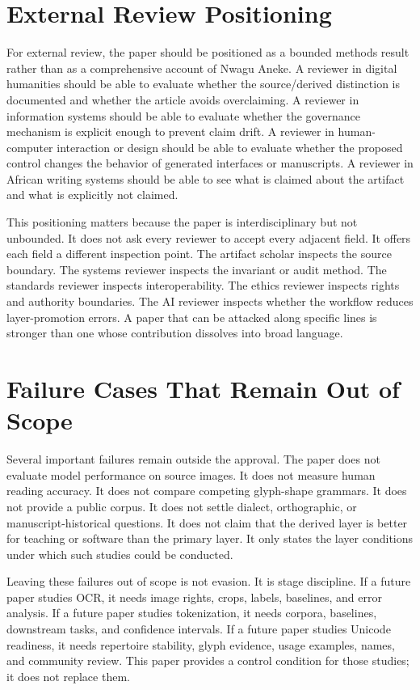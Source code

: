 \documentclass[sigconf,nonacm]{acmart}
\begin{document}
\section{External Review Positioning}
For external review, the paper should be positioned as a bounded methods result
rather than as a comprehensive account of Nwagu Aneke. A reviewer in digital
humanities should be able to evaluate whether the source/derived distinction is
documented and whether the article avoids overclaiming. A reviewer in
information systems should be able to evaluate whether the governance mechanism
is explicit enough to prevent claim drift. A reviewer in human-computer
interaction or design should be able to evaluate whether the proposed control
changes the behavior of generated interfaces or manuscripts. A reviewer in
African writing systems should be able to see what is claimed about the artifact
and what is explicitly not claimed.

This positioning matters because the paper is interdisciplinary but not
unbounded. It does not ask every reviewer to accept every adjacent field. It
offers each field a different inspection point. The artifact scholar inspects
the source boundary. The systems reviewer inspects the invariant or audit
method. The standards reviewer inspects interoperability. The ethics reviewer
inspects rights and authority boundaries. The AI reviewer inspects whether the
workflow reduces layer-promotion errors. A paper that can be attacked along
specific lines is stronger than one whose contribution dissolves into broad
language.

\section{Failure Cases That Remain Out of Scope}
Several important failures remain outside the approval. The paper does not
evaluate model performance on source images. It does not measure human reading
accuracy. It does not compare competing glyph-shape grammars. It does not
provide a public corpus. It does not settle dialect, orthographic, or
manuscript-historical questions. It does not claim that the derived layer is
better for teaching or software than the primary layer. It only states the layer
conditions under which such studies could be conducted.

Leaving these failures out of scope is not evasion. It is stage discipline. If a
future paper studies OCR, it needs image rights, crops, labels, baselines, and
error analysis. If a future paper studies tokenization, it needs corpora,
baselines, downstream tasks, and confidence intervals. If a future paper studies
Unicode readiness, it needs repertoire stability, glyph evidence, usage
examples, names, and community review. This paper provides a control condition
for those studies; it does not replace them.
\end{document}
